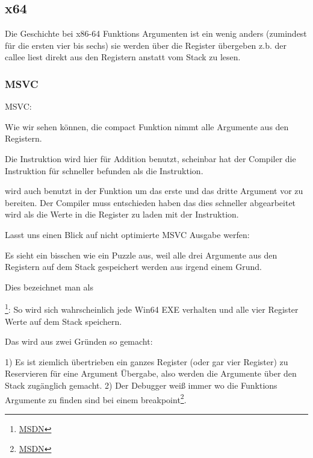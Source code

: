 \subsection{x64}


Die Geschichte bei x86-64 Funktions Argumenten ist ein wenig anders (zumindest für die ersten vier bis sechs)
sie werden über die Register übergeben z.b. der \gls{callee} liest direkt aus den Registern anstatt vom Stack 
zu lesen.

\subsubsection{MSVC}

\Optimizing MSVC:



Wie wir sehen können, die compact Funktion \ttf nimmt alle Argumente aus den Registern.

Die \LEA Instruktion wird hier für Addition benutzt,
scheinbar hat der Compiler die Instruktion für schneller befunden als
die  Instruktion.


\LEA wird auch benutzt in der \main Funktion um das erste und das dritte \ttf Argument vor zu bereiten.
Der Compiler muss entschieden haben das dies schneller abgearbeitet wird als die Werte in die Register 
zu laden mit der \MOV Instruktion.

Lasst uns einen Blick auf nicht optimierte MSVC Ausgabe werfen:



Es sieht ein bisschen wie ein Puzzle aus, weil alle drei Argumente aus den Registern auf dem Stack
gespeichert werden aus irgend einem Grund.

\label{shadow_space}
Dies bezeichnet man als 

\footnote{\href{http://msdn.microsoft.com/en-us/library/zthk2dkh(v=vs.80).aspx}{MSDN}}: 
So wird sich wahrscheinlich jede Win64 EXE verhalten und alle vier Register Werte auf dem Stack speichern.

Das wird aus zwei Gründen so gemacht:

1) Es ist ziemlich übertrieben ein ganzes Register (oder gar vier Register) zu Reservieren für eine
Argument Übergabe, also werden die Argumente über den Stack zugänglich gemacht.
2) Der Debugger weiß immer wo die Funktions Argumente zu finden sind bei einem breakpoint\footnote{\href{http://msdn.microsoft.com/en-us/library/ew5tede7(v=VS.90).aspx}{MSDN}}.


